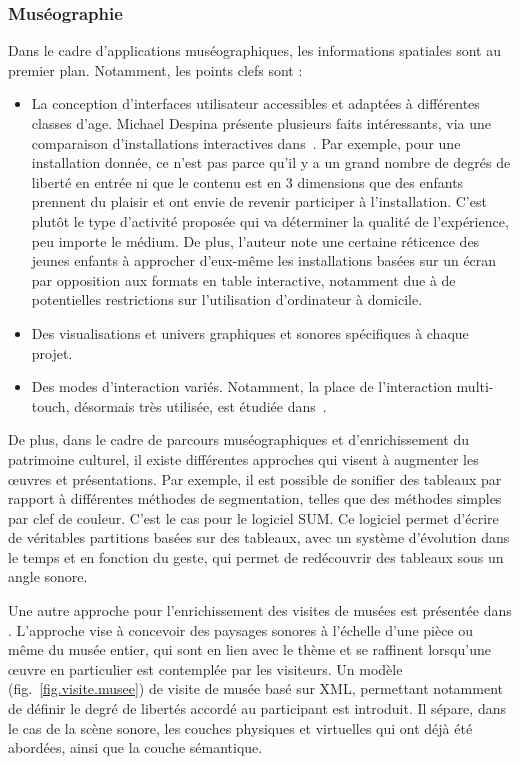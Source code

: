 \documentclass[french,12pt]{article}
\begin{document}
\subsubsection{Muséographie}
Dans le cadre d'applications muséographiques, les informations spatiales sont au premier plan. Notamment, les points clefs sont : 
\begin{itemize}
    \item La conception d'interfaces utilisateur accessibles et adaptées à différentes classes d'age. 
    Michael Despina présente plusieurs faits intéressants, via une comparaison d'installations interactives dans~\cite{michael_comparative_2010}. Par exemple, pour une installation donnée, ce n'est pas parce qu'il y a un grand nombre de degrés de liberté en entrée ni que le contenu est en 3 dimensions que des enfants prennent du plaisir et ont envie de revenir participer à l'installation. C'est plutôt le type d'activité proposée qui va déterminer la qualité de l'expérience, peu importe le médium. De plus, l'auteur note une certaine réticence des jeunes enfants à approcher d'eux-même les installations basées sur un écran par opposition aux formats en table interactive, notamment due à de potentielles restrictions sur l'utilisation d'ordinateur à domicile.
    \item Des visualisations et univers graphiques et sonores spécifiques à chaque projet.
    \item Des modes d'interaction variés. Notamment, la place de l'interaction multi-touch, désormais très utilisée, est étudiée dans~\cite{kidd_multi-touch_2011}.
\end{itemize}

De plus, dans le cadre de parcours muséographiques et d'enrichissement du patrimoine culturel, il existe différentes approches qui visent à augmenter les œuvres et présentations. Par exemple, il est possible de sonifier des tableaux par rapport à différentes méthodes de segmentation, telles que des méthodes simples par clef de couleur. C'est le cas pour le logiciel SUM\cite{adhitya_composing_2012}.
Ce logiciel permet d'écrire de véritables partitions basées sur des tableaux, avec un système d'évolution dans le temps et en fonction du geste, qui permet de redécouvrir des tableaux sous un angle sonore.

Une autre approche pour l'enrichissement des visites de musées est présentée dans \cite{azough_modeet_2014}. L'approche vise à concevoir des paysages sonores à l'échelle d'une pièce ou même du musée entier, qui sont en lien avec le thème et se raffinent lorsqu'une œuvre en particulier est contemplée par les visiteurs. Un modèle (fig.~\ref{fig.visite.musee}) de visite de musée basé sur XML, permettant notamment de définir le degré de libertés accordé au participant est introduit. Il sépare, dans le cas de la scène sonore, les couches physiques et virtuelles qui ont déjà été abordées, ainsi que la couche sémantique.
\end{document}
